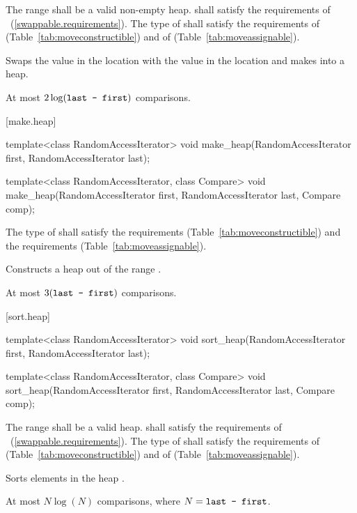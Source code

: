 \begin{itemdescr}
\pnum
\requires
The range
shall be a valid non-empty heap.
 shall satisfy the requirements of
~(\ref{swappable.requirements}). The type
of  shall satisfy the requirements of
 (Table~\ref{tab:moveconstructible}) and of
 (Table~\ref{tab:moveassignable}).


\pnum
\effects
Swaps the value in the location 
with the value in the location
and makes
into a heap.

\pnum
\complexity
At most
$2 \log(\texttt{last - first})$
comparisons.
\end{itemdescr}

[make.heap]{}

%
\begin{itemdecl}
template<class RandomAccessIterator>
  void make_heap(RandomAccessIterator first, RandomAccessIterator last);

template<class RandomAccessIterator, class Compare>
  void make_heap(RandomAccessIterator first, RandomAccessIterator last,
                 Compare comp);
\end{itemdecl}

\begin{itemdescr}
\pnum
\requires The type of  shall satisfy
the  requirements
(Table~\ref{tab:moveconstructible}) and the
 requirements
(Table~\ref{tab:moveassignable}).

\pnum
\effects
Constructs a heap out of the range
.

\pnum
\complexity
At most
$3(\texttt{last - first})$
comparisons.
\end{itemdescr}

[sort.heap]{}

%
\begin{itemdecl}
template<class RandomAccessIterator>
  void sort_heap(RandomAccessIterator first, RandomAccessIterator last);

template<class RandomAccessIterator, class Compare>
  void sort_heap(RandomAccessIterator first, RandomAccessIterator last,
                 Compare comp);
\end{itemdecl}

\begin{itemdescr}
\pnum
\requires The range  shall be a valid heap.
 shall satisfy the requirements of
~(\ref{swappable.requirements}). The type
of  shall satisfy the requirements of
 (Table~\ref{tab:moveconstructible}) and of
 (Table~\ref{tab:moveassignable}).

\pnum
\effects
Sorts elements in the heap
.

\pnum
\complexity
At most $N \log(N)$
comparisons, where
$N = \texttt{last - first}$.
\end{itemdescr}

